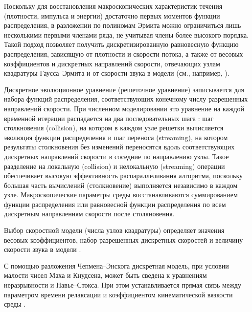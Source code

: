 \documentclass[12pt,a4paper]{article}
\begin{document}
Поскольку для восстановления макроскопических характеристик течения  (плотности, импульса и энергии) достаточно первых моментов функции распределения, в разложении по полиномам Эрмита можно ограничиться лишь несколькими первыми членами ряда, не учитывая члены более высокого порядка. Такой подход позволяет получить дискретизированную равновесную функцию распределения, зависящую от плотности и скорости потока, а также от весовых коэффициентов и дискретных направлений скорости, отвечающих узлам квадратуры Гаусса–Эрмита и от скорости звука в модели (см., например, \cite{Krger2017}).

Дискретное эволюционное уравнение (решеточное уравнение) записывается для набора функций распределения, соответствующих конечному числу разрешенных направлений скорости. При численном моделировании это уравнение на каждой временной итерации распадается на два последовательных шага \cite{Krger2017, Succi2018}: шаг столкновения (collision), на котором в каждом узле решетки вычисляется эволюция функции распределения и шаг переноса (streaming), на котором результаты столкновения без изменений переносятся вдоль соответствующих дискретных направлений скорости в соседние по направлению узлы. Такое разделение на локальную (collision) и нелокальную (streaming) операции обеспечивает высокую эффективность распараллеливания алгоритма, поскольку большая часть вычислений (столкновение) выполняется независимо в каждом узле. Макроскопические параметры среды восстанавливаются суммированием функции распределения или равновесной функции распределения по всем дискретным направлениям скорости после столкновения.

Выбор скоростной модели (числа узлов квадратуры) определяет значения весовых коэффициентов, набор разрешенных дискретных скоростей и величину скорости звука в модели \cite{Viggen2014, WolfGladrow2005, Latt2007}.



С помощью разложения Чепмена–Энскога \cite{Chapman1991} дискретная модель, при условии малости чисел Маха и Кнудсена, может быть сведена к уравнениям неразрывности и Навье–Стокса. При этом устанавливается прямая связь между параметром времени релаксации и коэффициентом кинематической вязкости среды \cite{Krger2017, Succi2018}.
\end{document}
